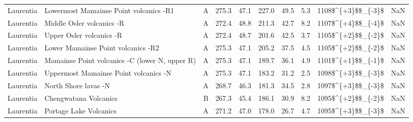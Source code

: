 \begin{longtable}{p{1 in}p{1 in}rrrrrrr}
                     Laurentia &             Lowermost Mamainse Point volcanics -R1 &      A &     275.3 &      47.1 & 227.0 &  49.5 &       5.3 &     1108\$\textasciicircum \{+3\}\$\$\_\{-3\}\$ &                                                NaN \\
                     Laurentia &                          Middle Osler volcanics -R &      A &     272.4 &      48.8 & 211.3 &  42.7 &       8.2 &     1107\$\textasciicircum \{+4\}\$\$\_\{-4\}\$ &                                                NaN \\
                     Laurentia &                           Upper Osler volcanics -R &      A &     272.4 &      48.7 & 201.6 &  42.5 &       3.7 &     1105\$\textasciicircum \{+2\}\$\$\_\{-2\}\$ &                                                NaN \\
                     Laurentia &                 Lower Mamainse Point volcanics -R2 &      A &     275.3 &      47.1 & 205.2 &  37.5 &       4.5 &     1105\$\textasciicircum \{+2\}\$\$\_\{-2\}\$ &                                                NaN \\
                     Laurentia &     Mamainse Point volcanics -C (lower N, upper R) &      A &     275.3 &      47.1 & 189.7 &  36.1 &       4.9 &     1101\$\textasciicircum \{+1\}\$\$\_\{-1\}\$ &                                                NaN \\
                     Laurentia &              Uppermost Mamainse Point volcanics -N &      A &     275.3 &      47.1 & 183.2 &  31.2 &       2.5 &     1098\$\textasciicircum \{+3\}\$\$\_\{-3\}\$ &                                                NaN \\
                     Laurentia &                               North Shore lavas -N &      A &     268.7 &      46.3 & 181.3 &  34.5 &       2.8 &     1097\$\textasciicircum \{+3\}\$\$\_\{-3\}\$ &                                                NaN \\
                     Laurentia &                              Chengwatana Volcanics &      B &     267.3 &      45.4 & 186.1 &  30.9 &       8.2 &     1095\$\textasciicircum \{+2\}\$\$\_\{-2\}\$ &                                                NaN \\
                     Laurentia &                             Portage Lake Volcanics &      A &     271.2 &      47.0 & 178.0 &  26.7 &       4.7 &     1095\$\textasciicircum \{+3\}\$\$\_\{-3\}\$ &                                                NaN \\

\end{longtable}
